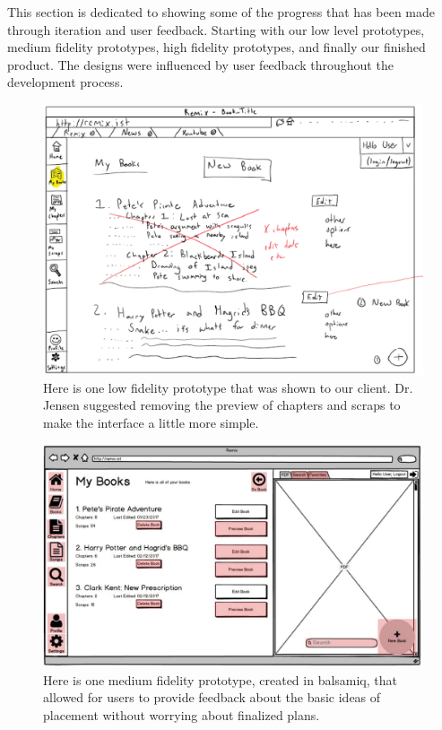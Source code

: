 \documentclass[onecolumn, draftclsnofoot,10pt, compsoc]{IEEEtran}
\begin{document}
	\noindent This section is dedicated to showing some of the progress that has been made through iteration and user feedback. Starting with our low level prototypes, medium fidelity prototypes, high fidelity prototypes, and finally our finished product. The designs were influenced by user feedback throughout the development process.
	
	\begin{figure}[ht!]
		\centering
		\includegraphics[width=\textwidth]{images/prototype}
		\caption{Here is one low fidelity prototype that was shown to our client. Dr. Jensen suggested 
			removing the preview of chapters and scraps to make the interface a little more simple.}
	\end{figure}
	
	\begin{figure}[ht!]
		\centering
		\includegraphics[width=\textwidth]{images/balsamiq}
		\caption{Here is one medium fidelity prototype, created in balsamiq, that allowed for users to provide feedback about the basic ideas of placement without worrying about finalized plans.}
	\end{figure}
	
\end{document}
